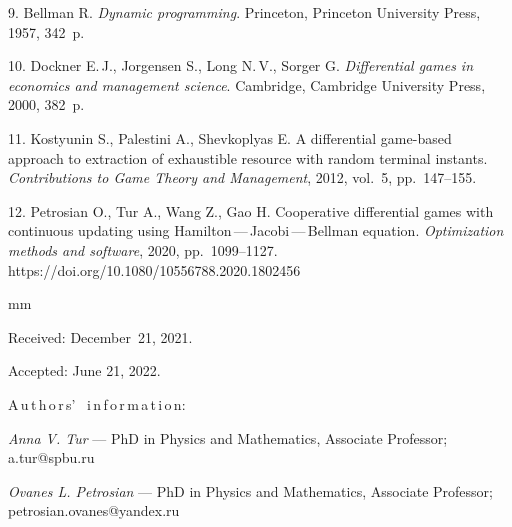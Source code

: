 {9.   Bellman R. {\it Dynamic programming}. Princeton, Princeton
University Press, 1957, 342~p.

10.  Dockner E.\,J.,  Jorgensen S.,  Long N.\,V.,   Sorger G. {\it
Differential games in economics and management science}. Cambridge,
Cambridge University Press, 2000, 382~p.

11.  Kostyunin S.,  Palestini A.,  Shevkoplyas E. A differential
game-based approach to extraction of exhaustible resource with
random terminal instants. {\it Contributions to Game Theory and
Management}, 2012,  vol.~5, pp.~147--155.

12.   Petrosian  O.,  Tur A.,  Wang Z., Gao  H. Cooperative
differential games with continuous updating using
Hamilton\,---\,Jacobi\,---\,Bellman equation.  {\it Optimization methods and
software},  2020, pp.~1099--1127. https://doi.org/10.1080/10556788.2020.1802456


mm

%


Received:  December~21, 2021.

Accepted: June 21, 2022.

\pagebreak

A\,u\,t\,h\,o\,r\,s' \ i\,n\,f\,o\,r\,m\,a\,t\,i\,o\,n:


\vskip 2mm
 \textit{Anna V. Tur} --- PhD in Physics and Mathematics,
Associate Professor; a.tur@spbu.ru \par


\vskip 2mm
 \textit{Ovanes L. Petrosian} --- PhD in Physics and
Mathematics, Associate Professor;\\ petrosian.ovanes@yandex.ru
 \par
%
%
}
